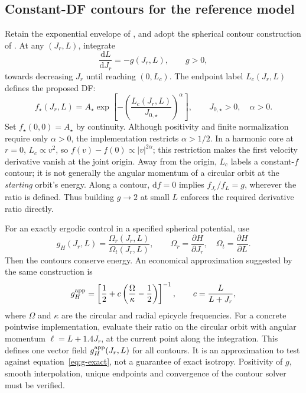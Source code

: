 \documentclass[11pt,a4paper]{article}
\newcommand{\dd}{\mathrm{d}}
\begin{document}
\subsection{Constant-DF contours for the reference model}
\label{sec:contours}

Retain the exponential envelope of \citet{2019MNRAS.488.2423P}, and adopt the
spherical contour construction of \citet{2026MNRAS.549ag854B}. At any
$(J_r,L)$, integrate
\begin{equation}
 \frac{\dd L}{\dd J_r}=-g(J_r,L),\qquad g>0,
 \label{eq:contour}
\end{equation}
towards decreasing $J_r$ until reaching $(0,L_c)$. The endpoint label
$L_c(J_r,L)$ defines the proposed DF:
\begin{equation}
 \boxed{f_\star(J_r,L)=A_\star
 \exp\left[-\left(\frac{L_c(J_r,L)}{J_{0,\star}}\right)^\alpha\right],
 \qquad J_{0,\star}>0,\quad\alpha>0.}
 \label{eq:stellar}
\end{equation}
Set $f_\star(0,0)=A_\star$ by continuity. Although positivity and finite
normalization require only $\alpha>0$, the implementation restricts
$\alpha>1/2$. In a harmonic core at $r=0$, $L_c\propto v^2$, so
$f(v)-f(0)\propto |v|^{2\alpha}$; this restriction makes the first velocity
derivative vanish at the joint origin. Away from the origin,
$L_c$ labels a constant-$f$ contour; it is not generally the angular
momentum of a circular orbit at the \emph{starting} orbit's energy.
Along a contour, $\dd f=0$ implies $f_{J_r}/f_L=g$, wherever the ratio is
defined. Thus building $g\to2$ at small $L$ enforces the required derivative
ratio directly.

For an exactly ergodic control in a specified spherical potential, use
\begin{equation}
 g_H(J_r,L)=\frac{\Omega_r(J_r,L)}{\Omega_t(J_r,L)},\qquad
 \Omega_r=\frac{\partial H}{\partial J_r},\quad
 \Omega_t=\frac{\partial H}{\partial L}.
 \label{eq:g-exact}
\end{equation}
Then the contours conserve energy. An economical approximation suggested
by the same construction is
\begin{equation}
 g_H^{\rm app}=\left[\frac12+c\left(\frac{\Omega}{\kappa}-\frac12\right)
                \right]^{-1},\qquad c=\frac{L}{L+J_r},
 \label{eq:g-approx}
\end{equation}
where $\Omega$ and $\kappa$ are the circular and radial epicycle frequencies.
For a concrete pointwise implementation, evaluate their ratio on the circular
orbit with angular momentum $\ell=L+1.4J_r$, at the current point along the
integration. This defines one vector field $g_H^{\rm app}(J_r,L)$ for all
contours. It is an approximation to test against equation~\eqref{eq:g-exact},
not a guarantee of exact isotropy. Positivity of $g$, smooth interpolation,
unique endpoints and convergence of the contour solver must be verified.
\end{document}
